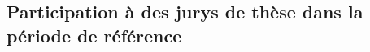 \documentclass[10pt,french,a4paper]{article}%
\begin{document}
\begin{itemize}
\end{itemize}


\subsection{Participation à des jurys de thèse dans la période de référence} %
\end{document}
